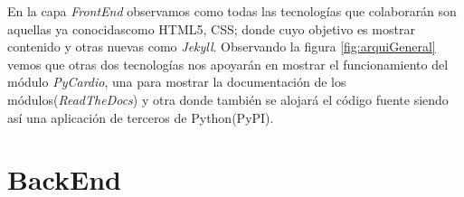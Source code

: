 En la capa \emph{FrontEnd} observamos como todas las tecnologías que colaborarán son aquellas ya conocidascomo HTML5, CSS; donde cuyo objetivo es mostrar contenido y otras nuevas como \emph{Jekyll}. Observando la figura \ref{fig:arquiGeneral} vemos que otras dos tecnologías nos apoyarán en mostrar el funcionamiento del módulo \emph{PyCardio}, una para mostrar la documentación de los módulos(\emph{ReadTheDocs}) y otra donde también se alojará el código fuente siendo así una aplicación de terceros de Python(PyPI).

\section{BackEnd}
\label{sec:backend}
